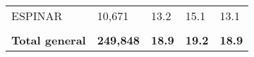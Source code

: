\begin{tabular}{lllll}
	\cellcolor[HTML]{FF5050}ESPINAR                                & 10,671                                                                & 13.2                                                                             & 15.1                                                                        & 13.1                                                                                \\
	&                                                                       &                                                                                  &                                                                             &                                                                                     \\
	\rowcolor[HTML]{DDEBF7} 
	\textbf{Total   general}                                       & \textbf{249,848}                                                      & \textbf{18.9}                                                                    & \textbf{19.2}                                                               & \textbf{18.9}                                                                      
\end{tabular}
